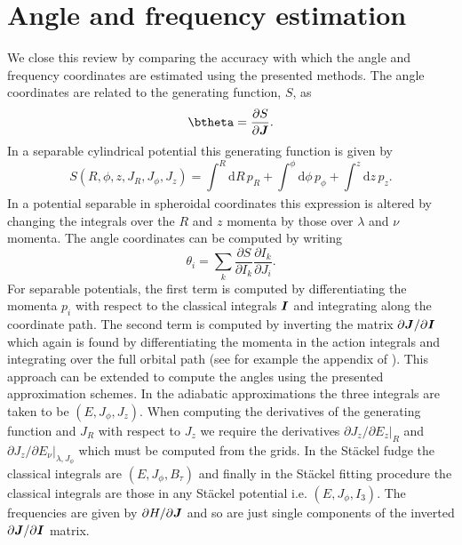 \documentclass[useAMS,usenatbib,fleqn,a4paper]{mn2e}
\newcommand{\bs}[1]{\bmath{#1}}
\begin{document}
\section{Angle and frequency estimation}\label{Sect::AngleFreq}

We close this review by comparing the accuracy with which the angle and frequency coordinates are estimated using the presented methods. The angle coordinates are related to the generating function, $S$, as
\begin{equation}
\btheta = \frac{\partial S}{\partial \bs{J}}.
\end{equation}
In a separable cylindrical potential this generating function is given by
\begin{equation}
S(R,\phi,z,J_R,J_\phi,J_z) = \int_{}^R\mathrm{d}R\,p_R+\int_{}^\phi\mathrm{d}\phi\,p_\phi+\int_{}^z\mathrm{d}z\,p_z.
\end{equation}
In a potential separable in spheroidal coordinates this expression is altered by changing the integrals over the $R$ and $z$ momenta by those over $\lambda$ and $\nu$ momenta.
The angle coordinates can be computed by writing
\begin{equation}
\theta_i = \sum_k\frac{\partial S}{\partial I_k}\frac{\partial I_k}{\partial J_i}.
\end{equation}
For separable potentials, the first term is computed by differentiating the momenta $p_i$ with respect to the classical integrals $\bs{I}$ and integrating along the coordinate path. The second term is computed by inverting the matrix $\partial \bs{J}/\partial \bs{I}$ which again is found by differentiating the momenta in the action integrals and integrating over the full orbital path (see for example the appendix of \cite{Sanders2012a}). This approach can be extended to compute the angles using the presented approximation schemes. In the adiabatic approximations the three integrals are taken to be $(E,J_\phi,J_z)$. When computing the derivatives of the generating function and $J_R$ with respect to $J_z$ we require the derivatives $\partial J_z/\partial E_z|_R$ and $\partial J_z/\partial E_\nu|_{\lambda,J_\phi}$ which must be computed from the grids. In the St\"ackel fudge the classical integrals are $(E,J_\phi,B_\tau)$ and finally in the St\"ackel fitting procedure the classical integrals are those in any St\"ackel potential i.e. $(E,J_\phi,I_3)$. The frequencies are given by $\partial H/\partial \bs{J}$ and so are just single components of the inverted $\partial \bs{J}/\partial \bs{I}$ matrix.
\end{document}
